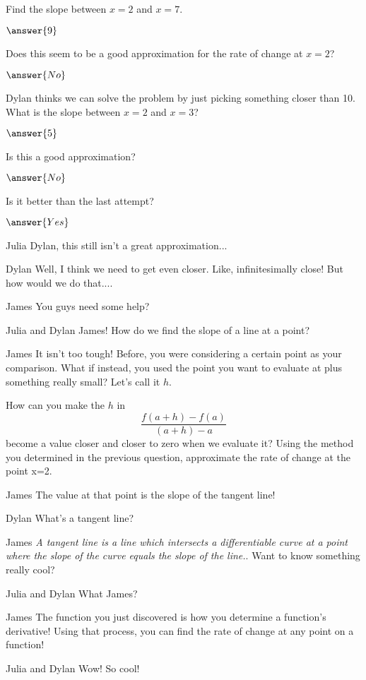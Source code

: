 \documentclass{ximera}
\begin{document}
\begin{question}
Find the slope between $x = 2$ and $x = 7$.

$\answer{9}$

Does this seem to be a good approximation for the rate of change at $x = 2$?

$\answer{No}$

Dylan thinks we can solve the problem by just picking something closer than 10. What is the slope between $x = 2$ and $x = 3$? 

$\answer{5}$

Is this a good approximation?

$\answer{No}$

Is it better than the last attempt?

$\answer{Yes}$
\end{question}
\begin{dialogue}
\item[Julia] Dylan, this still isn't a great approximation...
\item[Dylan] Well, I think we need to get even closer. Like, infinitesimally close! But how would we do that....
\item[James] You guys need some help?
\item[Julia and Dylan] James! How do we find the slope of a line at a point?
\item[James] It isn't too tough! Before, you were considering a certain point as your comparison. What if instead, you used the point you want to evaluate at plus something really small? Let's call it $h$.
\end{dialogue}
How can you make the $h$ in $$\frac{f(a+h)-f(a)}{(a+h)-a}$$ become a value closer and closer to zero when we evaluate it?
Using the method you determined in the previous question, approximate the rate of change at the point x=2.
\begin{dialogue}
\item[James] The value at that point is the slope of the tangent line!
\item[Dylan] What's a tangent line?
\item[James] \textit{A tangent line is a line which intersects a differentiable curve at a point where the slope of the curve equals the slope of the line.}. Want to know something really cool?
\item[Julia and Dylan] What James?
\item[James] The function you just discovered is how you determine a function's derivative! Using that process, you can find the rate of change at any point on a function!
\item[Julia and Dylan] Wow! So cool!
\end{dialogue}
\end{document}
